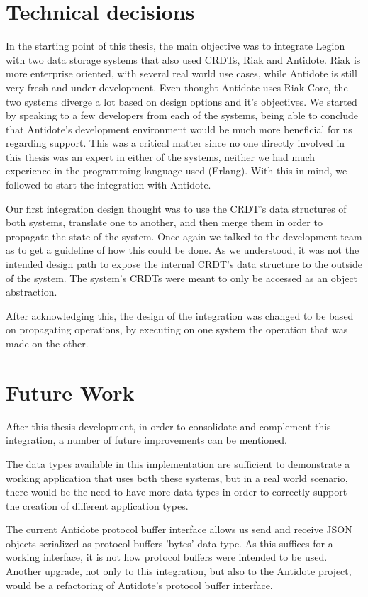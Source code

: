 \section{Technical decisions}
\label{sec:technical_decisions}
In the starting point of this thesis, the main objective was to integrate Legion with two data storage systems that also used CRDTs, Riak and Antidote. Riak is more enterprise oriented, with several real world use cases, while Antidote is still very fresh and under development. Even thought Antidote uses Riak Core, the two systems diverge a lot based on design options and it's objectives. We started by speaking to a few developers from each of the systems, being able to conclude that Antidote's development environment would be much more beneficial for us regarding support. This was a critical matter since no one directly involved in this thesis was an expert in either of the systems, neither we had much experience in the programming language used (Erlang). With this in mind, we followed to start the integration with Antidote.\par
Our first integration design thought was to use the CRDT's data structures of both systems, translate one to another, and then merge them in order to propagate the state of the system. Once again we talked to the development team as to get a guideline of how this could be done. As we understood, it was not the intended design path to expose the internal CRDT's data structure to the outside of the system. The system's CRDTs were meant to only be accessed as an object abstraction.\par
After acknowledging this, the design of the integration was changed to be based on propagating operations, by executing on one system the operation that was made on the other.

\section{Future Work}
\label{sec:future_work}
After this thesis development, in order to consolidate and complement this integration, a number of future improvements can be mentioned.\par
	The data types available in this implementation are sufficient to demonstrate a working application that uses both these systems, but in a real world scenario, there would be the need to have more data types in order to correctly support the creation of different application types.\par
	The current Antidote protocol buffer interface allows us send and receive JSON objects serialized as protocol buffers 'bytes' data type. As this suffices for a working interface, it is not how protocol buffers were intended to be used. Another upgrade, not only to this integration, but also to the Antidote project, would be a refactoring of Antidote's protocol buffer interface.